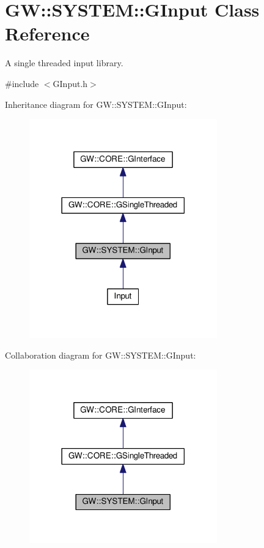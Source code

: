 \hypertarget{classGW_1_1SYSTEM_1_1GInput}{}\section{GW\+:\+:S\+Y\+S\+T\+EM\+:\+:G\+Input Class Reference}
\label{classGW_1_1SYSTEM_1_1GInput}


A single threaded input library.  




{\ttfamily \#include $<$G\+Input.\+h$>$}



Inheritance diagram for GW\+:\+:S\+Y\+S\+T\+EM\+:\+:G\+Input\+:\nopagebreak
\begin{figure}[H]
\begin{center}
\leavevmode
\includegraphics[width=230pt]{classGW_1_1SYSTEM_1_1GInput__inherit__graph}
\end{center}
\end{figure}


Collaboration diagram for GW\+:\+:S\+Y\+S\+T\+EM\+:\+:G\+Input\+:\nopagebreak
\begin{figure}[H]
\begin{center}
\leavevmode
\includegraphics[width=230pt]{classGW_1_1SYSTEM_1_1GInput__coll__graph}
\end{center}
\end{figure}
